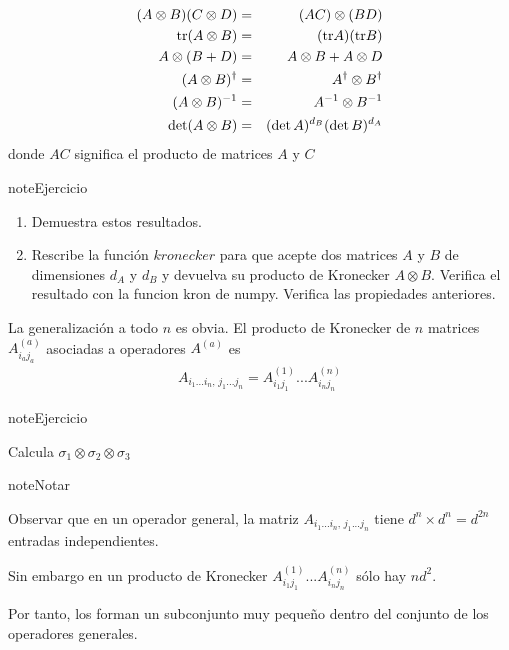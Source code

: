 \documentclass[letterpaper,10pt,english]{jupyterBook}
\newcommand{\tr}{{\rm tr}}
\begin{document}
\begin{eqnarray*}
(A\otimes B)(C\otimes D) &=& (AC)\otimes (BD) \nonumber\\ \rule{0mm}{6mm}
\tr(A\otimes B) &=& (\tr A)(\tr B) \nonumber\\ \rule{0mm}{6mm}
A\otimes(B+D) &=& A\otimes B + A\otimes D \nonumber\\ \rule{0mm}{6mm}
(A\otimes B)^\dagger &=& A^\dagger\otimes B^\dagger \nonumber\\ \rule{0mm}{6mm}
(A\otimes B)^{-1} &=& A^{-1} \otimes B^{-1} \nonumber\\ \rule{0mm}{6mm}
\det (A\otimes B) &=& (\det A)^{d_B}(\det B)^{d_A}
\end{eqnarray*}
\sphinxAtStartPar
donde \(AC\) significa el producto de matrices \(A\) y \(C\)

\begin{sphinxadmonition}{note}{Ejercicio}
\begin{enumerate}
%
\item {} 
\sphinxAtStartPar
Demuestra estos resultados.

\item {} 
\sphinxAtStartPar
Rescribe la función \(kronecker\)  para que acepte  dos matrices \(A\)  y \(B\) de dimensiones \(d_A\) y \(d_B\) y devuelva su producto de Kronecker \(A\otimes B\). Verifica el resultado con la funcion kron de numpy.   Verifica las propiedades anteriores.

\end{enumerate}
\end{sphinxadmonition}

\sphinxAtStartPar
La generalización a todo \(n\) es obvia. El producto de Kronecker de \(n\) matrices \( A^{(a)}_{i_aj_a}\) asociadas a operadores \(A^{(a)}\) es
\begin{equation*}
\begin{split}
 A_{i_1...i_n,\,j_1...j_n} = A^{(1)}_{i_1j_1}...A^{(n)}_{i_n j_n} 
\end{split}
\end{equation*}
\begin{sphinxadmonition}{note}{Ejercicio}

\sphinxAtStartPar
Calcula \(\sigma_1\otimes \sigma_2\otimes \sigma_3\)
\end{sphinxadmonition}

\begin{sphinxadmonition}{note}{Notar}

\sphinxAtStartPar
Observar que en un operador general, la matriz \( A_{i_1...i_n,\,j_1...j_n}\) tiene \(d^n\times d^n = d^{2n}\) entradas independientes.

\sphinxAtStartPar
Sin embargo
en un producto de Kronecker \(A^{(1)}_{i_1j_1}...A^{(n)}_{i_n j_n}\) sólo hay \(nd^2\).

\sphinxAtStartPar
Por tanto, los  forman un subconjunto muy pequeño dentro del conjunto de los operadores generales.
\end{sphinxadmonition}
\end{document}
